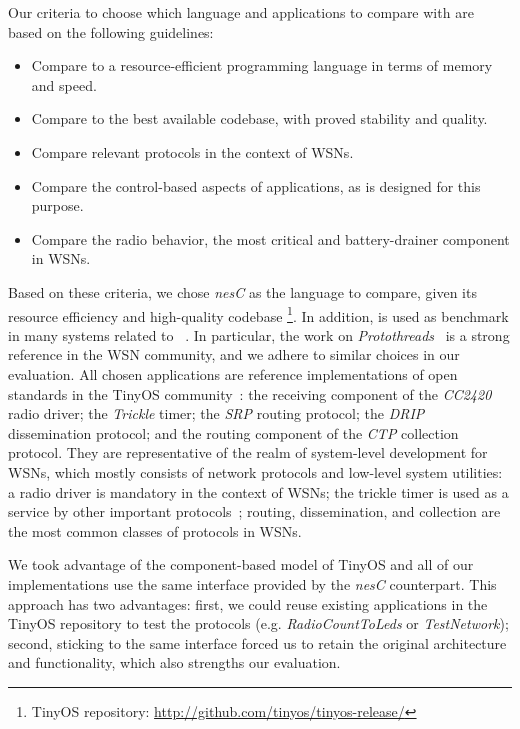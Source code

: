 Our criteria to choose which language and applications to compare with \CEU are 
based on the following guidelines:
%
\begin{itemize}
\item Compare to a resource-efficient programming language in terms of memory 
and speed.
\item Compare to the best available codebase, with proved stability and 
quality.
\item Compare relevant protocols in the context of WSNs.
\item Compare the control-based aspects of applications, as \CEU is designed 
      for this purpose.
\item Compare the radio behavior, the most critical and battery-drainer 
      component in WSNs.
\end{itemize}
%
Based on these criteria, we chose \emph{nesC} as the language to compare, given 
its resource efficiency and high-quality codebase%
\footnote{TinyOS repository: \url{http://github.com/tinyos/tinyos-release/}}.
%
In addition, \nesc is used as benchmark in many systems related to 
\CEU~\cite{wsn.protothreads,wsn.sol,wsn.ocram,wsn.flowtalk}.
In particular, the work on \emph{Protothreads}~\cite{wsn.protothreads} is a 
strong reference in the WSN community, and we adhere to similar choices in our 
evaluation.
%
All chosen applications are reference implementations of open standards in the 
TinyOS community~\cite{wsn.teps}:
the receiving component of the \emph{CC2420} radio driver;
the \emph{Trickle} timer;
the \emph{SRP} routing protocol;
the \emph{DRIP} dissemination protocol;
and the routing component of the \emph{CTP} collection protocol.
%
They are representative of the realm of system-level development for WSNs, 
which mostly consists of network protocols and low-level system utilities:
%
a radio driver is mandatory in the context of WSNs;
the trickle timer is used as a service by other important
protocols~\cite{wsn.trickle,wsn.ctp};
routing, dissemination, and collection are the most common classes of protocols 
in WSNs.

%

We took advantage of the component-based model of TinyOS and all of our 
implementations use the same interface provided by the \emph{nesC} counterpart.
This approach has two advantages:
first, we could reuse existing applications in the TinyOS repository to test 
the protocols (e.g. \emph{RadioCountToLeds} or \emph{TestNetwork});
second, sticking to the same interface forced us to retain the original 
architecture and functionality, which also strengths our evaluation.

